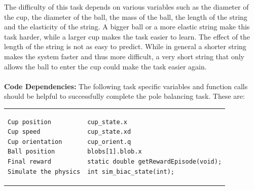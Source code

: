 \documentclass[11pt, article, colorback]{article}
\begin{document}
The difficulty of this task depends on various variables such as the diameter of the cup, the diameter of the ball, 
the mass of the ball, the length of the string and the elasticity of the string. A bigger ball or a more elastic string 
make this task harder, while a larger cup makes the task easier to learn. The effect of the length of the string is 
not as easy to predict. While in general a shorter string makes the system faster and thus more difficult, a very short string 
that only allows the ball to enter the cup could make the task easier again. 
		\\  \\
%
\textbf{Code Dependencies:} The following task specific variables and function calls should be helpful to 
successfully complete the pole balancing task. These are: \\
\begin{tabular}{ m{7cm} m{4cm}}
\begin{lstlisting}
Cup position
Cup speed 
Cup orientation
Ball position
Final reward
Simulate the physics
\end{lstlisting}
& \begin{lstlisting}
cup_state.x
cup_state.xd
cup_orient.q
blobs[1].blob.x
static double getRewardEpisode(void);
int sim_biac_state(int);
\end{lstlisting}
\end{tabular} \\
\end{document}
